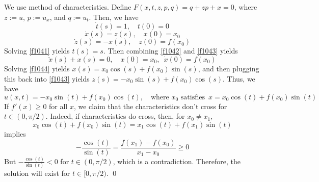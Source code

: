We use method of characteristics. Define $F(x,t,z,p,q) = q + zp + x = 0$, where $z := u$, $p := u_x$, and $q := u_t$. Then, we have
\begin{equation}
\label{f1041} \dot{t}(s) = 1, \quad t(0) = 0
\end{equation}
\begin{equation}
\label{f1042} \dot{x}(s) = z(s), \quad x(0) = x_0
\end{equation}
\begin{equation}
\label{f1043} \dot{z}(s) = -x(s), \quad z(0) = f(x_0)
\end{equation}
Solving \eqref{f1041} yields $t(s) = s$. Then combining \eqref{f1042} and \eqref{f1043} yields
\begin{equation}
\label{f1044}
\ddot{x}(s) + x(s) = 0, \quad x(0) = x_0, \,\,\, \dot{x}(0) = f(x_0)
\end{equation}
Solving \eqref{f1044} yields $x(s) = x_0 \cos(s) + f(x_0) \sin(s)$, and then plugging this back into \eqref{f1043} yields $z(s) = -x_0 \sin(s) + f(x_0) \cos(s)$. Thus, we have
$$ u(x,t) = -x_0 \sin(t) + f(x_0) \cos(t), \quad \text{where $x_0$ satisfies} \,\,\, x = x_0 \cos(t) + f(x_0) \sin(t) $$
If $f'(x) \geq 0$ for all $x$, we claim that the characteristics don't cross for $t \in (0,\pi/2)$. Indeed, if characteristics do cross, then, for $x_0 \neq x_1$,
$$ x_0 \cos(t) + f(x_0) \sin(t) = x_1 \cos(t) + f(x_1) \sin(t) $$
implies
$$ -\frac{\cos(t)}{\sin(t)} = \frac{f(x_1)-f(x_0)}{x_1 - x_0} \geq 0 $$
But $-\frac{\cos(t)}{\sin(t)} < 0$ for $t \in (0,\pi/2)$, which is a contradiction. Therefore, the solution will exist for $t \in [0,\pi/2)$. \hfill \qed


